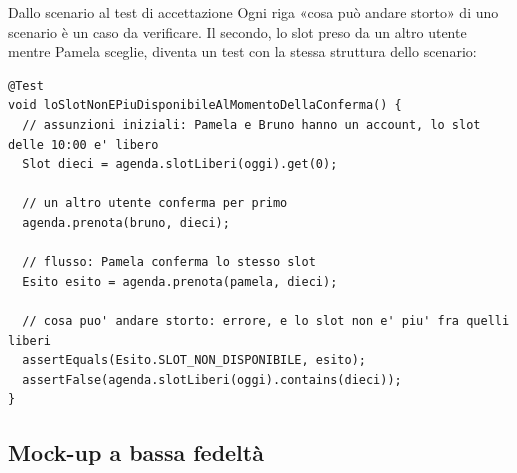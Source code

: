 \begin{esempio}{Dallo scenario al test di accettazione}
Ogni riga «cosa può andare storto» di uno scenario è un caso da verificare. Il secondo, lo slot preso da un altro utente
mentre Pamela sceglie, diventa un test con la stessa struttura dello scenario:
\begin{lstlisting}[style=java, name=PrenotazioneTest.java]
@Test
void loSlotNonEPiuDisponibileAlMomentoDellaConferma() {
  // assunzioni iniziali: Pamela e Bruno hanno un account, lo slot delle 10:00 e' libero
  Slot dieci = agenda.slotLiberi(oggi).get(0);

  // un altro utente conferma per primo
  agenda.prenota(bruno, dieci);

  // flusso: Pamela conferma lo stesso slot
  Esito esito = agenda.prenota(pamela, dieci);

  // cosa puo' andare storto: errore, e lo slot non e' piu' fra quelli liberi
  assertEquals(Esito.SLOT_NON_DISPONIBILE, esito);
  assertFalse(agenda.slotLiberi(oggi).contains(dieci));
}
\end{lstlisting}
\end{esempio}

\subsection{Mock-up a bassa fedeltà}


